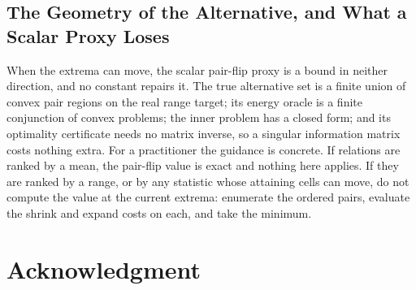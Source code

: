 \documentclass[conference]{IEEEtran}
\theoremstyle{definition}
\begin{document}
\subsection{The Geometry of the Alternative, and What a Scalar Proxy Loses}

When the extrema can move, the scalar pair-flip proxy is a bound in neither direction, and no
constant repairs it. The true alternative set is a finite union of convex pair regions on the
real range target; its energy oracle is a finite conjunction of convex problems; the inner
problem has a closed form; and its optimality certificate needs no matrix inverse, so a
singular information matrix costs nothing extra. For a practitioner the guidance is concrete.
If relations are ranked by a mean, the pair-flip value is exact and nothing here applies. If
they are ranked by a range, or by any statistic whose attaining cells can move, do not compute
the value at the current extrema: enumerate the ordered pairs, evaluate the shrink and expand
costs on each, and take the minimum.



\section*{Acknowledgment}
\end{document}
